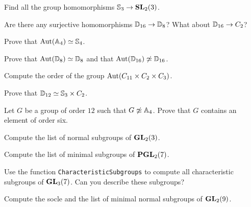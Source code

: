 \begin{prob}
  Find all the group homomorphisms $\mathbb{S}_3\to\mathbf{SL}_2(3)$. 
\end{prob}

\begin{prob}
    Are there any surjective homomorphisms $\mathbb{D}_{16}\to\mathbb{D}_{8}$? What about
    $\mathbb{D}_{16}\to C_2$?
\end{prob}

\begin{prob}
  \label{prob:Aut(A4)=S4}
   Prove that $\operatorname{Aut}(\mathbb{A}_4)\simeq\mathbb{S}_4$.
\end{prob}

\begin{prob}
  Prove that $\operatorname{Aut}(\mathbb{D}_8)\simeq\mathbb{D}_8$ and that 
  $\operatorname{Aut}(\mathbb{D}_{16})\not\simeq\mathbb{D}_{16}$.
\end{prob}

\begin{prob}
Compute the order of the group $\operatorname{Aut}(C_{11}\times C_2\times C_3)$. 
\end{prob}

\begin{prob}
  Prove that $\mathbb{D}_{12}\simeq\mathbb{S}_3\times C_2$.
\end{prob}

\begin{prob}
  Let $G$ be a group of order $12$ such that $G\not\simeq\mathbb{A}_4$. Prove that
  $G$ contains an element of order six.
\end{prob}

%

\begin{prob}
	\label{prob:minimal}
	Compute the list of normal subgroups of $\mathbf{GL}_2(3)$.
\end{prob}

\begin{prob}
	Compute the list of minimal subgroups of $\mathbf{PGL}_2(7)$.
\end{prob}

\begin{prob}
    Use the function \lstinline{CharacteristicSubgroups} to compute
    all characteristic subgroups of $\mathbf{GL}_3(7)$. Can you describe these subgroups?
\end{prob}

\begin{prob}
	\label{prob:socle}
	Compute the socle and the list of minimal normal subgroups of $\mathbf{GL}_2(9)$. 
\end{prob}

